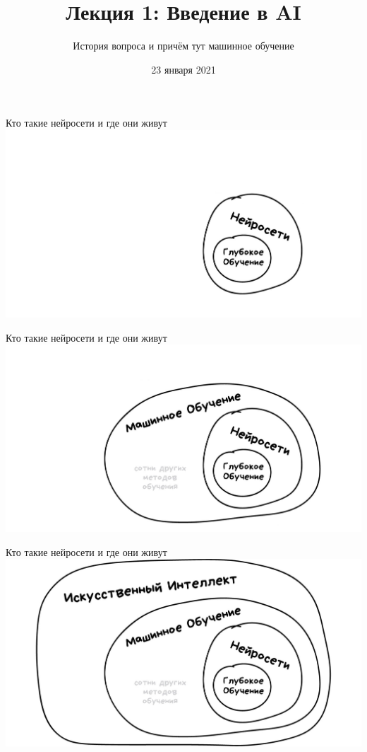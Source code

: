 \documentclass[aspectratio=169]{beamer}
\title{Лекция 1: Введение в AI}
\subtitle{История вопроса и причём тут машинное обучение}
\date{23 января 2021}
\begin{document}
\maketitle

\begin{frame}{Кто такие нейросети и где они живут}
    \centering
    \includegraphics[width=.9\linewidth]{graphs/fig1_0.jpg}
\end{frame}

\begin{frame}{Кто такие нейросети и где они живут}
    \centering
    \includegraphics[width=.9\linewidth]{graphs/fig1_1.jpg}
\end{frame}

\begin{frame}{Кто такие нейросети и где они живут}
    \centering
    \includegraphics[width=.9\linewidth]{graphs/fig1_2.jpg}
\end{frame}
\end{document}
